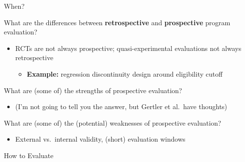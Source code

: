 \documentclass[10pt,xcolor=table,ignorenonframetext,handout,aspectratio=169]{beamer}
\newlength{\wideitemsep}
\let\olditem\item
\renewcommand{\item}{\setlength{\itemsep}{\wideitemsep}\olditem}
\begin{document}
\begin{frame}{When?}

\medskip
What are the differences between \textbf{retrospective} and \textbf{prospective} program evaluation?

\pause
\medskip
\begin{itemize}
	
	\item RCTs are not always prospective; quasi-experimental evaluations not always retrospective
	
	\medskip
	\begin{itemize}
		
		\item \textbf{Example:}  regression discontinuity design around eligibility cutoff
		
	\end{itemize}
	
\end{itemize}

\pause
\medskip
\medskip
What are (some of) the strengths of prospective evaluation?

\medskip
\begin{itemize}
	
	\item (I'm not going to tell you the answer, but Gertler et al.~have thoughts)
	
\end{itemize}

\pause
\medskip
\medskip
What are (some of) the (potential) weaknesses of prospective evaluation?

\pause
\medskip
\begin{itemize}
	
	\item External vs.~internal validity, (short) evaluation windows
	
\end{itemize}

\end{frame}







\begin{frame}[plain]

	
	\begin{center}
		
		\Large{\textcolor{williams}{How to Evaluate}}
		
	\end{center}
	
\end{frame}
\end{document}
